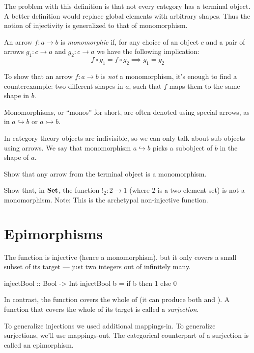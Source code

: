 \documentclass[DaoFP]{subfiles}
\begin{document}
The problem with this definition is that not every category has a terminal object. A better definition would replace global elements with arbitrary shapes. Thus the notion of injectivity is generalized to that of monomorphism. 

An arrow $f \colon a \to b$ is  \emph{monomorphic} if, for any choice of an object $c$ and a pair of arrows $g_1 \colon c \to a$ and $g_2 \colon c \to a$ we have the following implication:
\[ f \circ g_1 = f \circ g_2 \implies g_1 = g_2 \]

To show that an arrow $f \colon a \to b$ is \emph{not} a monomorphism, it's enough to find a counterexample: two different shapes in $a$, such that $f$ maps them to the same shape in $b$. 

Monomorphisms, or ``monos'' for short, are often denoted using special arrows, as in $a \hookrightarrow b$ or $a \rightarrowtail b$. 

In category theory objects are indivisible, so we can only talk about sub-objects using arrows. We say that monomorphism $a \hookrightarrow b$ picks a subobject of $b$ in the shape of $a$.

\begin{exercise}
Show that any arrow from the terminal object is a monomorphism.
\end{exercise}
\begin{exercise}
Show that, in $\mathbf{Set}$, the function $!_2 \colon 2 \to 1$ (where $2$ is a two-element set) is not a monomorphism. Note: This is the archetypal non-injective function.
\end{exercise}

\section{Epimorphisms}

The function  is injective (hence a monomorphism), but it only covers a small subset of its target --- just two integers out of infinitely many.
\begin{haskell}
injectBool :: Bool -> Int
injectBool b = if b then 1 else 0
\end{haskell}
In contrast, the function  covers the whole of  (it can produce both  and ). A function that covers the whole of its target is called a \emph{surjection}.

To generalize injections we used additional mappings-in. To generalize surjections, we'll use mappings-out. The categorical counterpart of a surjection is called an epimorphism.
\end{document}
